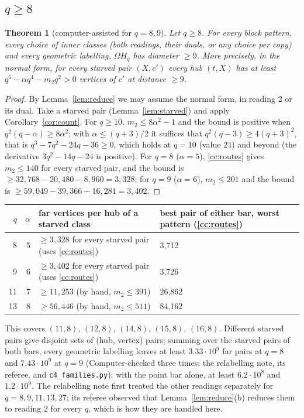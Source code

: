 \documentclass[11pt]{amsart}
\newcommand{\file}[1]{\nolinkurl{#1}}
\theoremstyle{plain}
\newtheorem{theorem}{Theorem}
\theoremstyle{definition}
\theoremstyle{remark}
\newcommand{\Om}{\Omega}
\begin{document}
\subsection{$q \ge 8$}

\begin{theorem}[computer-assisted for $q = 8, 9$]\label{thm:geo8}
Let $q \ge 8$. For every block pattern, every choice of inner classes (both readings, their duals, or any choice per
copy) and every geometric labelling, $\Om H_q$ has diameter $\ge 9$. More precisely, in the normal form, for every
starved pair $(X, c')$ every hub $(t,X)$ has at least $q^5 - \alpha q^4 - m_2q^2 > 0$ vertices of $c'$ at distance
$\ge 9$.
\end{theorem}

\begin{proof}
By Lemma~\ref{lem:reduce} we may assume the normal form, in reading 2 or its dual. Take a starved pair
(Lemma~\ref{lem:starved}) and apply Corollary~\ref{cor:count}. For $q \ge 10$, $m_2 \le 8\alpha^2 - 1$ and the bound is
positive when $q^2(q - \alpha) \ge 8\alpha^2$; with $\alpha \le (q+3)/2$ it suffices that $q^2(q-3) \ge 4(q+3)^2$, that is
$q^3 - 7q^2 - 24q - 36 \ge 0$, which holds at $q = 10$ (value $24$) and beyond (the derivative $3q^2 - 14q - 24$ is
positive). For $q = 8$ ($\alpha = 5$), \ref{cc:routes} gives $m_2 \le 140$ for every starved pair, and the bound is
$\ge 32{,}768 - 20{,}480 - 8{,}960 = 3{,}328$; for $q = 9$ ($\alpha = 6$), $m_2 \le 201$ and the bound is
$\ge 59{,}049 - 39{,}366 - 16{,}281 = 3{,}402$.
\end{proof}

\begin{center}\small
\begin{tabular}{@{}rrll@{}}
\toprule
$q$ & $\alpha$ & far vertices per hub of a starved class & best pair of either bar, worst pattern (\ref{cc:routes})\\
\midrule
8 & 5 & $\ge 3{,}328$ for every starved pair (uses \ref{cc:routes}) & 3,712\\
9 & 6 & $\ge 3{,}402$ for every starved pair (uses \ref{cc:routes}) & 3,726\\
11 & 7 & $\ge 11{,}253$ (by hand, $m_2 \le 391$) & 26,862\\
13 & 8 & $\ge 56{,}446$ (by hand, $m_2 \le 511$) & 84,162\\
\bottomrule
\end{tabular}
\end{center}

This covers $(11,8)$, $(12,8)$, $(14,8)$, $(15,8)$, $(16,8)$. Different starved pairs give disjoint sets of (hub, vertex)
pairs; summing over the starved pairs of both bars, every geometric labelling leaves at least $3.33 \cdot 10^9$ far pairs
at $q = 8$ and $7.43 \cdot 10^9$ at $q = 9$ (Computer-checked three times: the relabelling note, its referee, and
\file{c4_families.py}); with the point bar alone, at least $6.2 \cdot 10^8$ and $1.2 \cdot 10^9$. The relabelling note first treated the other
readings separately for $q = 8, 9, 11, 13, 27$; its referee observed that Lemma~\ref{lem:reduce}(b) reduces them to
reading 2 for every $q$, which is how they are handled here.
\end{document}
